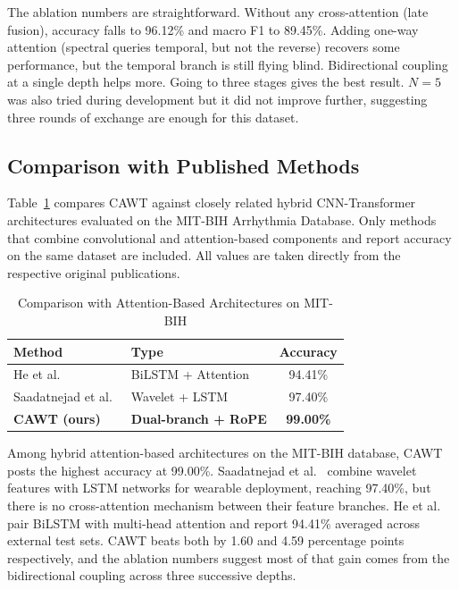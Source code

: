 \documentclass[conference]{IEEEtran}
\begin{document}
The ablation numbers are straightforward. Without any cross-attention (late fusion), accuracy falls to 96.12\% and macro F1 to 89.45\%. Adding one-way attention (spectral queries temporal, but not the reverse) recovers some performance, but the temporal branch is still flying blind. Bidirectional coupling at a single depth helps more. Going to three stages gives the best result. $N=5$ was also tried during development but it did not improve further, suggesting three rounds of exchange are enough for this dataset.
 
\subsection{Comparison with Published Methods}
Table~\ref{tab:sota} compares CAWT against closely related hybrid CNN-Transformer architectures evaluated on the MIT-BIH Arrhythmia Database. Only methods that combine convolutional and attention-based components and report accuracy on the same dataset are included. All values are taken directly from the respective original publications.

\begin{table}[H]
\centering
\caption{Comparison with Attention-Based Architectures on MIT-BIH}
\label{tab:sota}
\footnotesize
\begin{tabular}{@{}llc@{}}
\toprule
\textbf{Method} & \textbf{Type} & \textbf{Accuracy} \\
\midrule
He et al.~\cite{he2025} & BiLSTM + Attention & 94.41\% \\
Saadatnejad et al.~\cite{saadatnejad2020} & Wavelet + LSTM & 97.40\% \\
\midrule
\textbf{CAWT (ours)} & \textbf{Dual-branch + RoPE} & \textbf{99.00\%} \\
\bottomrule
\end{tabular}
\end{table}

Among hybrid attention-based architectures on the MIT-BIH database, CAWT posts the highest accuracy at 99.00\%. Saadatnejad et al.~\cite{saadatnejad2020} combine wavelet features with LSTM networks for wearable deployment, reaching 97.40\%, but there is no cross-attention mechanism between their feature branches. He et al.~\cite{he2025} pair BiLSTM with multi-head attention and report 94.41\% averaged across external test sets. CAWT beats both by 1.60 and 4.59 percentage points respectively, and the ablation numbers suggest most of that gain comes from the bidirectional coupling across three successive depths.
\end{document}
